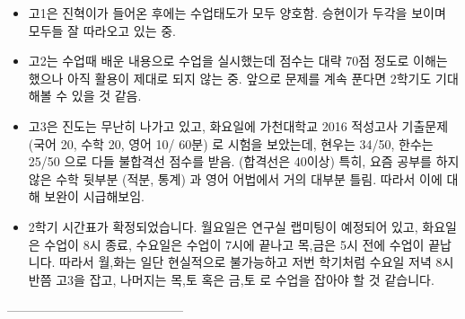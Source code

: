 \documentclass[idxtotoc,hyperref,openany]{labbook} %
\begin{document}

\begin{itemize}
	\item 고1은 진혁이가 들어온 후에는 수업태도가 모두 양호함. 승현이가 두각을 보이며 모두들 잘 따라오고 있는 중.
	\item 고2는 수업때 배운 내용으로 수업을 실시했는데 점수는 대략 70점 정도로 이해는 했으나 아직 활용이 제대로 되지 않는 중. 앞으로 문제를 계속
	푼다면 2학기도 기대해볼 수 있을 것 같음.
	\item 고3은 진도는 무난히 나가고 있고, 화요일에 가천대학교 2016 적성고사 기출문제 (국어 20, 수학 20, 영어 10/ 60분) 로 시험을 보았는데, 현우는
	34/50, 한수는 25/50 으로 다들 불합격선 점수를 받음. (합격선은 40이상) 특히, 요즘 공부를 하지 않은 수학 뒷부분 (적분, 통계) 과 영어 어법에서 거의 대부분 틀림.
	따라서 이에 대해 보완이 시급해보임.
\end{itemize}



\begin{itemize}
 \item 2학기 시간표가 확정되었습니다. 월요일은 연구실 랩미팅이 예정되어 있고, 화요일은 수업이 8시 종료, 수요일은 수업이 7시에 끝나고 목,금은 5시 전에
 수업이 끝납니다. 따라서 월,화는 일단 현실적으로 불가능하고 저번 학기처럼 수요일 저녁 8시 반쯤 고3을 잡고, 나머지는 목,토 혹은
 금,토 로 수업을 잡아야 할 것 같습니다.
\end{itemize}



------------------------------------------










\end{document}
